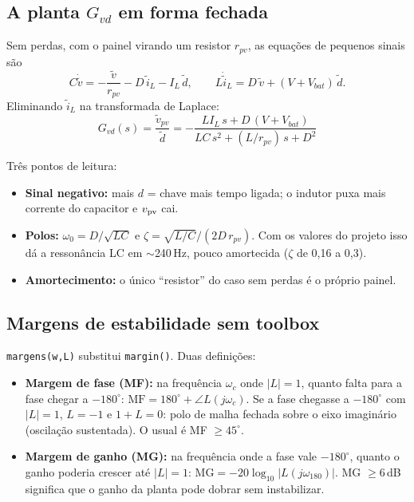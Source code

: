 \subsection{A planta $G_{vd}$ em forma fechada}

Sem perdas, com o painel virando um resistor $r_{pv}$, as equa\c{c}\~oes de pequenos sinais s\~ao
\begin{equation}
C\dot{\tilde v}=-\frac{\tilde v}{r_{pv}}-D\,\tilde i_L-I_L\,\tilde d,\qquad
L\dot{\tilde i}_L=D\,\tilde v+(V+V_{bat})\,\tilde d .
\end{equation}
Eliminando $\tilde i_L$ na transformada de Laplace:
\begin{equation}\label{eq:gvd}
G_{vd}(s)=\frac{\tilde v_{pv}}{\tilde d}=-\frac{L I_L\,s+D\,(V+V_{bat})}{L C\,s^2+(L/r_{pv})\,s+D^2}
\end{equation}


Tr\^es pontos de leitura:
\begin{itemize}
\item \textbf{Sinal negativo:} mais $d$ = chave mais tempo ligada; o indutor puxa mais corrente do capacitor e $v_{\mathrm{pv}}$ cai.
\item \textbf{Polos:} $\omega_0=D/\sqrt{LC}$ e $\zeta=\sqrt{L/C}/(2D\,r_{pv})$. Com os valores do projeto isso d\'a a
 resson\^ancia LC em $\sim$240\,Hz, pouco amortecida ($\zeta$ de 0,16 a 0,3).
\item \textbf{Amortecimento:} o \'unico ``resistor'' do caso sem perdas \'e o pr\'oprio painel.
\end{itemize}


\subsection{Margens de estabilidade sem toolbox}

\texttt{margens(w,L)} substitui \texttt{margin()}. Duas defini\c{c}\~oes:
\begin{itemize}
\item \textbf{Margem de fase (MF):} na frequ\^encia $\omega_c$ onde $|L|=1$, quanto falta para a fase chegar a $-180^\circ$:
 $\mathrm{MF}=180^\circ+\angle L(j\omega_c)$. Se a fase chegasse a $-180^\circ$ com $|L|=1$, $L=-1$ e $1+L=0$: polo de malha
 fechada sobre o eixo imagin\'ario (oscila\c{c}\~ao sustentada). O usual \'e MF $\ge45^\circ$.
\item \textbf{Margem de ganho (MG):} na frequ\^encia onde a fase vale $-180^\circ$, quanto o ganho poderia crescer at\'e
 $|L|=1$: $\mathrm{MG}=-20\log_{10}|L(j\omega_{180})|$. MG $\ge6$\,dB significa que o ganho da planta pode dobrar sem instabilizar.
\end{itemize}

